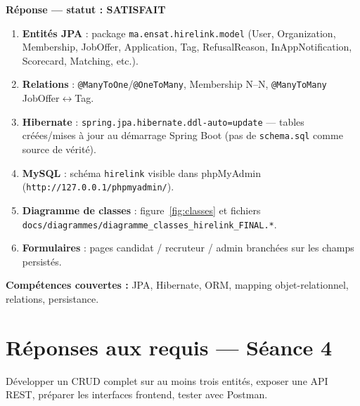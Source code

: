 \documentclass[11pt,a4paper,oneside]{report}
\begin{document}
\begin{okbox}
\textbf{Réponse --- statut : SATISFAIT}
\begin{enumerate}[leftmargin=1.3em]
  \item \textbf{Entités JPA} : package \texttt{ma.ensat.hirelink.model} (User, Organization, Membership, JobOffer, Application, Tag, RefusalReason, InAppNotification, Scorecard, Matching, etc.).
  \item \textbf{Relations} : \texttt{@ManyToOne}/\texttt{@OneToMany}, Membership N--N, \texttt{@ManyToMany} JobOffer$\leftrightarrow$Tag.
  \item \textbf{Hibernate} : \texttt{spring.jpa.hibernate.ddl-auto=update} --- tables créées/mises à jour au démarrage Spring Boot (pas de \texttt{schema.sql} comme source de vérité).
  \item \textbf{MySQL} : schéma \texttt{hirelink} visible dans phpMyAdmin (\texttt{http://127.0.0.1/phpmyadmin/}).
  \item \textbf{Diagramme de classes} : figure~\ref{fig:classes} et fichiers \texttt{docs/diagrammes/diagramme\_classes\_hirelink\_FINAL.*}.
  \item \textbf{Formulaires} : pages candidat / recruteur / admin branchées sur les champs persistés.
\end{enumerate}
\end{okbox}

\textbf{Compétences couvertes :} JPA, Hibernate, ORM, mapping objet-relationnel, relations, persistance.

\chapter{Réponses aux requis --- Séance 4}

\begin{reqbox}[title=\textbf{Requis Séance 4}]
Développer un CRUD complet sur au moins trois entités, exposer une API REST, préparer les interfaces frontend, tester avec Postman.
\end{reqbox}
\end{document}

